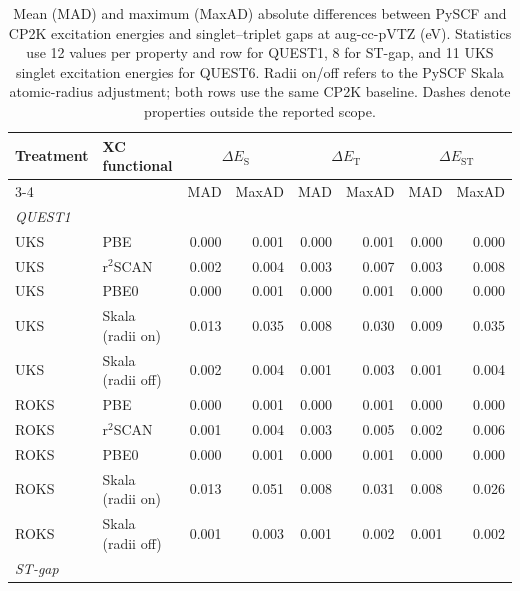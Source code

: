 \begin{table}[htbp]
\centering
\caption{Mean (MAD) and maximum (MaxAD) absolute differences between PySCF
and CP2K excitation energies and singlet--triplet gaps at aug-cc-pVTZ (eV).
Statistics use 12 values per property and row for QUEST1, 8 for ST-gap,
and 11 UKS singlet excitation energies for QUEST6.
Radii on/off refers to the PySCF Skala atomic-radius adjustment; both rows use
the same CP2K baseline. Dashes denote properties outside the reported scope.}
\label{tab:si_codes}
\footnotesize
\setlength{\tabcolsep}{4pt}
\begin{tabular}{@{}llrrrrrr@{}}
\hline
Treatment & XC functional & \multicolumn{2}{c}{$\Delta E_{\mathrm{S}}$} & \multicolumn{2}{c}{$\Delta E_{\mathrm{T}}$} & \multicolumn{2}{c}{$\Delta E_{\mathrm{ST}}$} \\
\cline{3-4}\cline{5-6}\cline{7-8}
 & & MAD & MaxAD & MAD & MaxAD & MAD & MaxAD \\
\hline
\multicolumn{8}{l}{\textit{QUEST1}} \\
UKS & PBE & 0.000 & 0.001 & 0.000 & 0.001 & 0.000 & 0.000 \\
UKS & r$^2$SCAN & 0.002 & 0.004 & 0.003 & 0.007 & 0.003 & 0.008 \\
UKS & PBE0 & 0.000 & 0.001 & 0.000 & 0.001 & 0.000 & 0.000 \\
UKS & Skala (radii on) & 0.013 & 0.035 & 0.008 & 0.030 & 0.009 & 0.035 \\
UKS & Skala (radii off) & 0.002 & 0.004 & 0.001 & 0.003 & 0.001 & 0.004 \\
\noalign{\smallskip}
ROKS & PBE & 0.000 & 0.001 & 0.000 & 0.001 & 0.000 & 0.000 \\
ROKS & r$^2$SCAN & 0.001 & 0.004 & 0.003 & 0.005 & 0.002 & 0.006 \\
ROKS & PBE0 & 0.000 & 0.001 & 0.000 & 0.001 & 0.000 & 0.000 \\
ROKS & Skala (radii on) & 0.013 & 0.051 & 0.008 & 0.031 & 0.008 & 0.026 \\
ROKS & Skala (radii off) & 0.001 & 0.003 & 0.001 & 0.002 & 0.001 & 0.002 \\
\hline
\multicolumn{8}{l}{\textit{ST-gap}} \\

\end{tabular}
\end{table}
